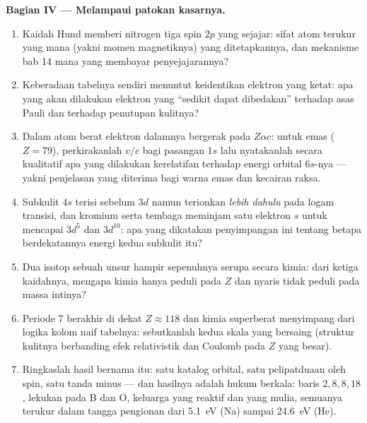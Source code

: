\begin{problem}
\medskip\noindent\textbf{Bagian IV --- Melampaui patokan kasarnya.}
\begin{enumerate}[resume]
  \item Kaidah Hund memberi nitrogen tiga spin $2p$ yang sejajar: sifat
        atom terukur yang mana (yakni momen magnetiknya) yang
        ditetapkannya, dan mekanisme bab 14 mana yang membayar
        penyejajarannya?
  \item Keberadaan tabelnya sendiri menuntut keidentikan elektron yang
        ketat: apa yang akan dilakukan elektron yang ``sedikit dapat
        dibedakan'' terhadap asas Pauli dan terhadap penutupan kulitnya?
  \item Dalam atom berat elektron dalamnya bergerak pada $Z\alpha c$:
        untuk emas ($Z = 79$), perkirakanlah $v/c$ bagi pasangan $1s$
        lalu nyatakanlah secara kualitatif apa yang dilakukan kerelatifan
        terhadap energi orbital $6s$-nya --- yakni penjelasan yang
        diterima bagi warna emas dan kecairan raksa.
  \item Subkulit $4s$ terisi sebelum $3d$ namun terionkan \emph{lebih
        dahulu} pada logam transisi, dan kromium serta tembaga meminjam
        satu elektron $s$ untuk mencapai $3d^5$ dan $3d^{10}$: apa yang
        dikatakan penyimpangan ini tentang betapa berdekatannya energi
        kedua subkulit itu?
  \item Dua isotop sebuah unsur hampir sepenuhnya serupa secara kimia:
        dari ketiga kaidahnya, mengapa kimia hanya peduli pada $Z$ dan
        nyaris tidak peduli pada massa intinya?
  \item Periode 7 berakhir di dekat $Z \approx 118$ dan kimia superberat
        menyimpang dari logika kolom naif tabelnya: sebutkanlah kedua
        skala yang bersaing (struktur kulitnya berbanding efek
        relativistik dan Coulomb pada $Z$ yang besar).
  \item Ringkaslah hasil bernama itu: satu katalog orbital, satu
        pelipatduaan oleh spin, satu tanda minus --- dan hasilnya adalah
        hukum berkala: baris $2, 8, 8, 18$, lekukan pada B dan O,
        keluarga yang reaktif dan yang mulia, semuanya terukur dalam
        tangga pengionan dari \qty{5.1}{eV} (Na) sampai
        \qty{24.6}{eV} (He).
\end{enumerate}
\end{problem}

